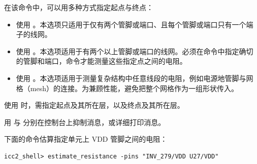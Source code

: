 在该命令中，可以用多种方式指定起点与终点：
\begin{itemize}
  \item 使用 。本选项只适用于仅有两个管脚或端口、且每个管脚或端口只有一个端子的线网。
  \item 使用 。本选项适用于有两个以上管脚或端口的线网。必须在命令中指定确切的管脚和端口，命令才能测量这些指定点之间的电阻。
  \item 使用 。本选项适用于测量复杂结构中任意线段的电阻，例如电源地管脚与网格（mesh）的连接。为兼顾性能，避免把整个网格作为一组形状传入。
\end{itemize}

使用  时，需指定起点及其所在层，以及终点及其所在层。

用  与  分别在控制台上抑制消息，或详细打印消息。

下面的命令估算指定单元上 VDD 管脚之间的电阻：
\begin{lstlisting}
icc2_shell> estimate_resistance -pins "INV_279/VDD U27/VDD"
\end{lstlisting}

